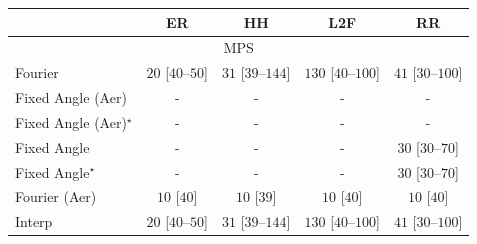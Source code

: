\begin{tabular}{l|cccc|}
\toprule
            & ER & HH & L2F & RR \\
\midrule
\multicolumn{5}{c}{\rule{0pt}{8pt}MPS} \\
\midrule
Fourier & {\cellcolor[HTML]{F5FBF3}} \color[HTML]{000000} $20$ [$40$--$50$] & {\cellcolor[HTML]{F4FBF1}} \color[HTML]{000000} $31$ [$39$--$144$] & {\cellcolor[HTML]{DFF3DA}} \color[HTML]{000000} $130$ [$40$--$100$] & {\cellcolor[HTML]{F1FAEE}} \color[HTML]{000000} $41$ [$30$--$100$] \\
Fixed Angle (Aer) & {\cellcolor[HTML]{000000}} \color[HTML]{F1F1F1} {\cellcolor{white}} \color{black} - & {\cellcolor[HTML]{000000}} \color[HTML]{F1F1F1} {\cellcolor{white}} \color{black} - & {\cellcolor[HTML]{000000}} \color[HTML]{F1F1F1} {\cellcolor{white}} \color{black} - & {\cellcolor[HTML]{000000}} \color[HTML]{F1F1F1} {\cellcolor{white}} \color{black} - \\
Fixed Angle (Aer)$^\star$ & {\cellcolor[HTML]{000000}} \color[HTML]{F1F1F1} {\cellcolor{white}} \color{black} - & {\cellcolor[HTML]{000000}} \color[HTML]{F1F1F1} {\cellcolor{white}} \color{black} - & {\cellcolor[HTML]{000000}} \color[HTML]{F1F1F1} {\cellcolor{white}} \color{black} - & {\cellcolor[HTML]{000000}} \color[HTML]{F1F1F1} {\cellcolor{white}} \color{black} - \\
Fixed Angle & {\cellcolor[HTML]{000000}} \color[HTML]{F1F1F1} {\cellcolor{white}} \color{black} - & {\cellcolor[HTML]{000000}} \color[HTML]{F1F1F1} {\cellcolor{white}} \color{black} - & {\cellcolor[HTML]{000000}} \color[HTML]{F1F1F1} {\cellcolor{white}} \color{black} - & {\cellcolor[HTML]{F4FBF1}} \color[HTML]{000000} $30$ [$30$--$70$] \\
Fixed Angle$^\star$ & {\cellcolor[HTML]{000000}} \color[HTML]{F1F1F1} {\cellcolor{white}} \color{black} - & {\cellcolor[HTML]{000000}} \color[HTML]{F1F1F1} {\cellcolor{white}} \color{black} - & {\cellcolor[HTML]{000000}} \color[HTML]{F1F1F1} {\cellcolor{white}} \color{black} - & {\cellcolor[HTML]{F4FBF1}} \color[HTML]{000000} $30$ [$30$--$70$] \\
Fourier (Aer) & {\cellcolor[HTML]{F7FCF5}} \color[HTML]{000000} $10$ [$40$] & {\cellcolor[HTML]{F7FCF5}} \color[HTML]{000000} $10$ [$39$] & {\cellcolor[HTML]{F7FCF5}} \color[HTML]{000000} $10$ [$40$] & {\cellcolor[HTML]{F7FCF5}} \color[HTML]{000000} $10$ [$40$] \\
Interp & {\cellcolor[HTML]{F5FBF3}} \color[HTML]{000000} $20$ [$40$--$50$] & {\cellcolor[HTML]{F4FBF1}} \color[HTML]{000000} $31$ [$39$--$144$] & {\cellcolor[HTML]{DFF3DA}} \color[HTML]{000000} $130$ [$40$--$100$] & {\cellcolor[HTML]{F1FAEE}} \color[HTML]{000000} $41$ [$30$--$100$] \\

\end{tabular}
